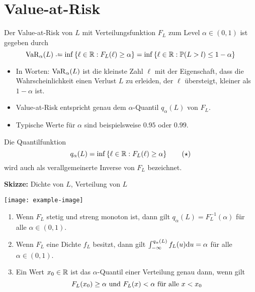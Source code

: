 \section{Value-at-Risk}

\begin{*definition}
	Der Value-at-Risk von $L$ mit Verteilungsfunktion $F_L$ zum Level $\alpha \in (0,1)$ ist gegeben durch
	\begin{equation*}
		\VaR_\alpha(L) \defeq \inf \menge{\ell \in \R: F_L(\ell) \ge \alpha} = \inf \menge{\ell \in \R: \P(L > l) \le 1 - \alpha}
	\end{equation*}
\end{*definition}

\begin{itemize}[nolistsep]
	\item In Worten: $\operatorname{VaR}_\alpha(L)$ ist die kleinste Zahl $\ell$ mit der Eigenschaft, dass die Wahrscheinlichkeit einen Verlust $L$ zu erleiden, der $\ell$ übersteigt, kleiner als $1-\alpha$ ist.
	\item Value-at-Risk entspricht genau dem $\alpha$-Quantil $q_\alpha(L)$ von $F_L$.
	\item Typische Werte für $\alpha$ sind beispielsweise $0.95$ oder $0.99$.
\end{itemize}

Die Quantilfunktion
\begin{equation*}
	q_\alpha(L) = \inf \left\{ \ell \in \mathbb{R}: F_L(\ell) \ge \alpha \right\}
	\tag{$\star$} \label{eq: quantil-star}
\end{equation*}
wird auch als verallgemeinerte Inverse von $F_L$ bezeichnet.

\textbf{Skizze:} Dichte von $L$, Verteilung von $L$
\begin{center}
	\texttt{[image: example-image]}
\end{center}

\begin{lemma}
	\begin{enumerate}[label=(\alph*)]
		\item Wenn $F_L$ stetig und streng monoton ist, dann gilt $q_\alpha(L) = F_L^{-1}(\alpha)$ für alle $\alpha \in (0,1)$.
		\item Wenn $F_L$ eine Dichte $f_L$ besitzt, dann gilt $\int_{-\infty}^{q_\alpha(L)} f_L(u) \mathrm{d}{u} = \alpha$ für alle $\alpha \in (0,1)$.
		\item Ein Wert $x_0 \in \mathbb{R}$ ist das $\alpha$-Quantil einer Verteilung genau dann, wenn gilt
		\begin{equation*}
			F_L(x_0) \ge \alpha \text{ und } F_L(x) < \alpha \text{ für alle } x < x_0
		\end{equation*} 
	\end{enumerate}
\end{lemma}

